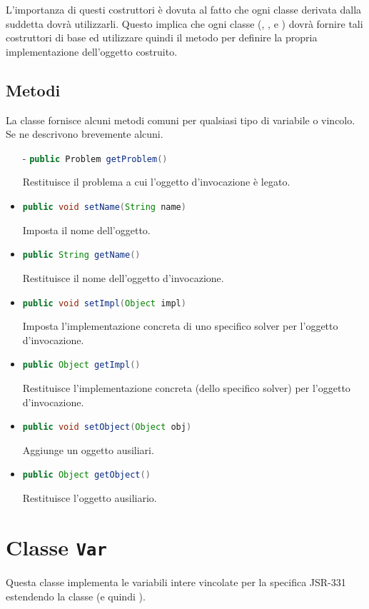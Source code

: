 L'importanza di questi costruttori è dovuta al fatto che ogni classe derivata
dalla suddetta dovrà utilizzarli. Questo implica che ogni classe
(, ,  e
) dovrà fornire tali costruttori di base ed 
utilizzare quindi il metodo  per definire la propria
implementazione dell'oggetto costruito.  


\subsection{Metodi}
La classe  fornisce alcuni metodi comuni per qualsiasi tipo
di variabile o vincolo. Se ne descrivono brevemente alcuni.
\begin{itemize}
\item[-]\lstinline[language = Java]$public Problem getProblem()$

Restituisce il problema a cui l'oggetto
d'invocazione è legato.

\item[-]\lstinline[language = Java]$public void setName(String name)$

Imposta il nome dell'oggetto.

\item[-]\lstinline[language = Java]$public String getName()$

Restituisce il nome dell'oggetto
d'invocazione.

\item[-]\lstinline[language = Java]$public void setImpl(Object impl)$

Imposta l'implementazione concreta di uno 
specifico solver per l'oggetto d'invocazione.

\item[-]\lstinline[language = Java]$public Object getImpl()$

Restituisce l'implementazione concreta (dello 
specifico solver) per l'oggetto d'invocazione.

\item[-]\lstinline[language = Java]$public void setObject(Object obj)$

Aggiunge un oggetto ausiliari.

\item[-]\lstinline[language = Java]$public Object getObject()$ 

Restituisce l'oggetto ausiliario.
\end{itemize}


\section{Classe \texttt{Var}}
Questa classe implementa le variabili intere vincolate
 per la specifica JSR-331
estendendo la classe  (e quindi 
).

